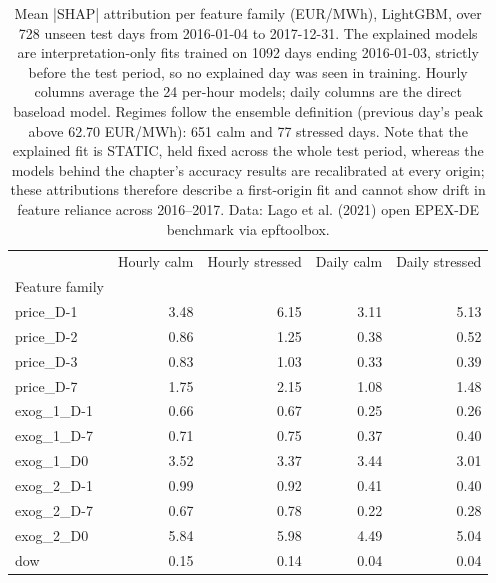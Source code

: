 \begin{table}[htbp]
\caption{Mean |SHAP| attribution per feature family (EUR/MWh), LightGBM, over 728 unseen test days from 2016-01-04 to 2017-12-31. The explained models are interpretation-only fits trained on 1092 days ending 2016-01-03, strictly before the test period, so no explained day was seen in training. Hourly columns average the 24 per-hour models; daily columns are the direct baseload model. Regimes follow the ensemble definition (previous day's peak above 62.70 EUR/MWh): 651 calm and 77 stressed days. Note that the explained fit is STATIC, held fixed across the whole test period, whereas the models behind the chapter's accuracy results are recalibrated at every origin; these attributions therefore describe a first-origin fit and cannot show drift in feature reliance across 2016--2017. Data: Lago et al. (2021) open EPEX-DE benchmark via epftoolbox.}
\label{tab:shap-importance}
\begin{tabular}{lrrrr}
\toprule
 & Hourly calm & Hourly stressed & Daily calm & Daily stressed \\
Feature family &  &  &  &  \\
\midrule
price\_D-1 & 3.48 & 6.15 & 3.11 & 5.13 \\
price\_D-2 & 0.86 & 1.25 & 0.38 & 0.52 \\
price\_D-3 & 0.83 & 1.03 & 0.33 & 0.39 \\
price\_D-7 & 1.75 & 2.15 & 1.08 & 1.48 \\
exog\_1\_D-1 & 0.66 & 0.67 & 0.25 & 0.26 \\
exog\_1\_D-7 & 0.71 & 0.75 & 0.37 & 0.40 \\
exog\_1\_D0 & 3.52 & 3.37 & 3.44 & 3.01 \\
exog\_2\_D-1 & 0.99 & 0.92 & 0.41 & 0.40 \\
exog\_2\_D-7 & 0.67 & 0.78 & 0.22 & 0.28 \\
exog\_2\_D0 & 5.84 & 5.98 & 4.49 & 5.04 \\
dow & 0.15 & 0.14 & 0.04 & 0.04 \\
\bottomrule
\end{tabular}
\end{table}
